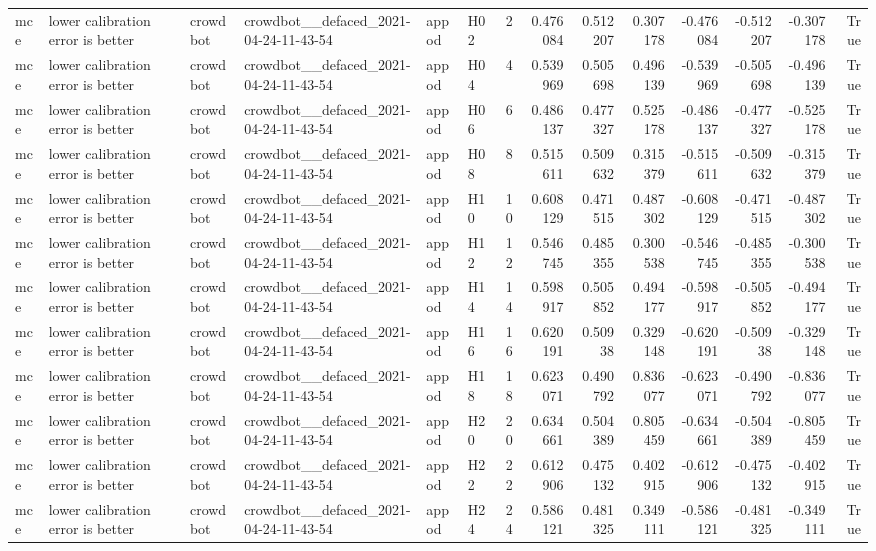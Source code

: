 \begin{longtable}{llllllrrrrrrrr}
mce & lower calibration error is better & crowdbot & crowdbot\_\_defaced\_2021-04-24-11-43-54 & appod & H02 & 2 & 0.476084 & 0.512207 & 0.307178 & -0.476084 & -0.512207 & -0.307178 & True \\
mce & lower calibration error is better & crowdbot & crowdbot\_\_defaced\_2021-04-24-11-43-54 & appod & H04 & 4 & 0.539969 & 0.505698 & 0.496139 & -0.539969 & -0.505698 & -0.496139 & True \\
mce & lower calibration error is better & crowdbot & crowdbot\_\_defaced\_2021-04-24-11-43-54 & appod & H06 & 6 & 0.486137 & 0.477327 & 0.525178 & -0.486137 & -0.477327 & -0.525178 & True \\
mce & lower calibration error is better & crowdbot & crowdbot\_\_defaced\_2021-04-24-11-43-54 & appod & H08 & 8 & 0.515611 & 0.509632 & 0.315379 & -0.515611 & -0.509632 & -0.315379 & True \\
mce & lower calibration error is better & crowdbot & crowdbot\_\_defaced\_2021-04-24-11-43-54 & appod & H10 & 10 & 0.608129 & 0.471515 & 0.487302 & -0.608129 & -0.471515 & -0.487302 & True \\
mce & lower calibration error is better & crowdbot & crowdbot\_\_defaced\_2021-04-24-11-43-54 & appod & H12 & 12 & 0.546745 & 0.485355 & 0.300538 & -0.546745 & -0.485355 & -0.300538 & True \\
mce & lower calibration error is better & crowdbot & crowdbot\_\_defaced\_2021-04-24-11-43-54 & appod & H14 & 14 & 0.598917 & 0.505852 & 0.494177 & -0.598917 & -0.505852 & -0.494177 & True \\
mce & lower calibration error is better & crowdbot & crowdbot\_\_defaced\_2021-04-24-11-43-54 & appod & H16 & 16 & 0.620191 & 0.50938 & 0.329148 & -0.620191 & -0.50938 & -0.329148 & True \\
mce & lower calibration error is better & crowdbot & crowdbot\_\_defaced\_2021-04-24-11-43-54 & appod & H18 & 18 & 0.623071 & 0.490792 & 0.836077 & -0.623071 & -0.490792 & -0.836077 & True \\
mce & lower calibration error is better & crowdbot & crowdbot\_\_defaced\_2021-04-24-11-43-54 & appod & H20 & 20 & 0.634661 & 0.504389 & 0.805459 & -0.634661 & -0.504389 & -0.805459 & True \\
mce & lower calibration error is better & crowdbot & crowdbot\_\_defaced\_2021-04-24-11-43-54 & appod & H22 & 22 & 0.612906 & 0.475132 & 0.402915 & -0.612906 & -0.475132 & -0.402915 & True \\
mce & lower calibration error is better & crowdbot & crowdbot\_\_defaced\_2021-04-24-11-43-54 & appod & H24 & 24 & 0.586121 & 0.481325 & 0.349111 & -0.586121 & -0.481325 & -0.349111 & True \\

\end{longtable}
